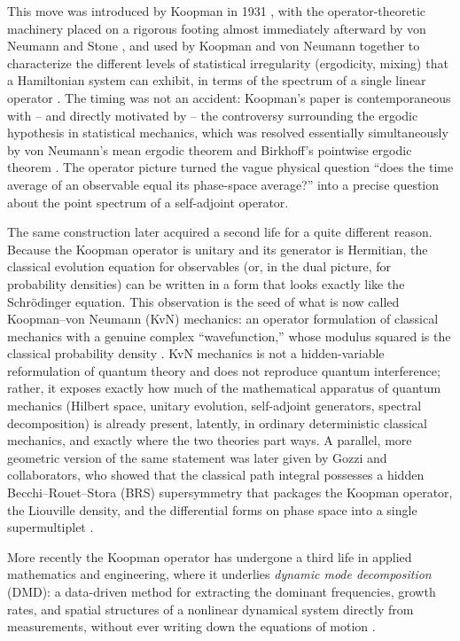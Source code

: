 \documentclass[11pt]{article}
\theoremstyle{remark}
\begin{document}
This move was introduced by Koopman in 1931 \cite{Koopman1931}, with the operator-theoretic machinery placed on a rigorous footing almost immediately afterward by von Neumann \cite{vonNeumann1932} and Stone \cite{Stone1932}, and used by Koopman and von Neumann together to characterize the different levels of statistical irregularity (ergodicity, mixing) that a Hamiltonian system can exhibit, in terms of the spectrum of a single linear operator \cite{KoopmanVonNeumann1932}. The timing was not an accident: Koopman's paper is contemporaneous with -- and directly motivated by -- the controversy surrounding the ergodic hypothesis in statistical mechanics, which was resolved essentially simultaneously by von Neumann's mean ergodic theorem and Birkhoff's pointwise ergodic theorem \cite{Birkhoff1931}. The operator picture turned the vague physical question ``does the time average of an observable equal its phase-space average?'' into a precise question about the point spectrum of a self-adjoint operator.

The same construction later acquired a second life for a quite different reason. Because the Koopman operator is unitary and its generator is Hermitian, the classical evolution equation for observables (or, in the dual picture, for probability densities) can be written in a form that looks exactly like the Schr\"odinger equation. This observation is the seed of what is now called Koopman--von Neumann (KvN) mechanics: an operator formulation of classical mechanics with a genuine complex ``wavefunction,'' whose modulus squared is the classical probability density \cite{Mauro2002}. KvN mechanics is not a hidden-variable reformulation of quantum theory and does not reproduce quantum interference; rather, it exposes exactly how much of the mathematical apparatus of quantum mechanics (Hilbert space, unitary evolution, self-adjoint generators, spectral decomposition) is already present, latently, in ordinary deterministic classical mechanics, and exactly where the two theories part ways. A parallel, more geometric version of the same statement was later given by Gozzi and collaborators, who showed that the classical path integral possesses a hidden Becchi--Rouet--Stora (BRS) supersymmetry that packages the Koopman operator, the Liouville density, and the differential forms on phase space into a single supermultiplet \cite{Gozzi1988,GozziReuterThacker1989}.

More recently the Koopman operator has undergone a third life in applied mathematics and engineering, where it underlies \emph{dynamic mode decomposition} (DMD): a data-driven method for extracting the dominant frequencies, growth rates, and spatial structures of a nonlinear dynamical system directly from measurements, without ever writing down the equations of motion \cite{Mezic2005,RowleyEtAl2009,Schmid2010}.
\end{document}
